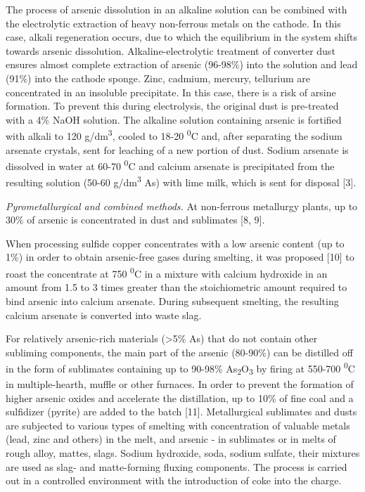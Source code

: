 The process of arsenic dissolution in an alkaline solution can be
combined with the electrolytic extraction of heavy non-ferrous metals on
the cathode. In this case, alkali regeneration occurs, due to which the
equilibrium in the system shifts towards arsenic dissolution.
Alkaline-electrolytic treatment of converter dust ensures almost
complete extraction of arsenic (96-98\%) into the solution and lead
(91\%) into the cathode sponge. Zinc, cadmium, mercury, tellurium are
concentrated in an insoluble precipitate. In this case, there is a risk
of arsine formation. To prevent this during electrolysis, the original
dust is pre-treated with a 4\% NaOH solution. The alkaline solution
containing arsenic is fortified with alkali to 120
g/dm\textsuperscript{3}, cooled to 18-20 \textsuperscript{0}C and, after
separating the sodium arsenate crystals, sent for leaching of a new
portion of dust. Sodium arsenate is dissolved in water at 60-70
\textsuperscript{0}C and calcium arsenate is precipitated from the
resulting solution (50-60 g/dm\textsuperscript{3} As) with lime milk,
which is sent for disposal {[}3{]}.

\emph{Pyrometallurgical and combined methods.} At non-ferrous metallurgy
plants, up to 30\% of arsenic is concentrated in dust and sublimates
{[}8, 9{]}.

When processing sulfide copper concentrates with a low arsenic content
(up to 1\%) in order to obtain arsenic-free gases during smelting, it
was proposed {[}10{]} to roast the concentrate at 750
\textsuperscript{0}C in a mixture with calcium hydroxide in an amount
from 1.5 to 3 times greater than the stoichiometric amount required to
bind arsenic into calcium arsenate. During subsequent smelting, the
resulting calcium arsenate is converted into waste slag.

For relatively arsenic-rich materials (\textgreater5\% As) that do not
contain other subliming components, the main part of the arsenic
(80-90\%) can be distilled off in the form of sublimates containing up
to 90-98\% As\textsubscript{2}O\textsubscript{3} by firing at 550-700
\textsuperscript{0}C in multiple-hearth, muffle or other furnaces. In
order to prevent the formation of higher arsenic oxides and accelerate
the distillation, up to 10\% of fine coal and a sulfidizer (pyrite) are
added to the batch {[}11{]}. Metallurgical sublimates and dusts are
subjected to various types of smelting with concentration of valuable
metals (lead, zinc and others) in the melt, and arsenic - in sublimates
or in melts of rough alloy, mattes, slags. Sodium hydroxide, soda,
sodium sulfate, their mixtures are used as slag- and matte-forming
fluxing components. The process is carried out in a controlled
environment with the introduction of coke into the charge.

